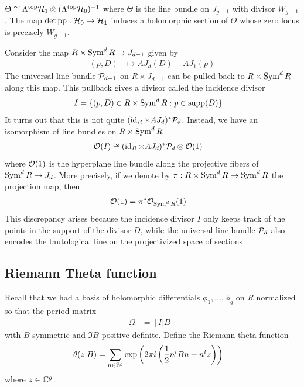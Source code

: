 \documentclass[12pt]{article}
\begin{document}
\begin{theorem}
    $\Theta \cong \Lambda^{\mathrm{top}} {\mathcal{H}}_1 \otimes (\Lambda^{\mathrm{top}} {\mathcal{H}}_0)^{-1}$ where $\Theta$ is the line bundle on $J_{g-1}$ with divisor $W_{g-1}$. The map $\det \mathrm{pp}:{\mathcal{H}}_0 \to {\mathcal{H}}_1$ induces a holomorphic section of $\Theta$ whose zero locus is precisely $W_{g-1}$.
\end{theorem}

\begin{remark}
      Consider the map $R \times \operatorname{Sym}^d R \to J_{d-1}$ given by \begin{align*}
        (p, D) & \mapsto AJ_d(D) - AJ_1(p)
    \end{align*}  The universal line bundle ${\mathcal{P}}_{d-1}$ on $R \times J_{d-1}$ can be pulled back to $R \times \operatorname{Sym}^d R$ along this map. This pullback gives a divisor called the incidence divisor \begin{align*}
        I & = \{(p, D) \in R \times \operatorname{Sym}^d R : p \in \operatorname{supp}(D) \}
    \end{align*} It turns out that this is not quite $(\operatorname{id}_R \times AJ_d)^* {\mathcal{P}}_d$. Instead, we have an isomorphism of line bundles on $R \times \operatorname{Sym}^d R$ \begin{align*}
        {\mathcal{O}}(I) & \cong (\operatorname{id}_R \times AJ_d)^* {\mathcal{P}}_d \otimes {\mathcal{O}}(1)
    \end{align*} where ${\mathcal{O}}(1)$ is the hyperplane line bundle along the projective fibers of $\operatorname{Sym}^d R \to J_d$. More precisely, if we denote by $\pi:R \times \operatorname{Sym}^d R \to \operatorname{Sym}^d R$ the projection map, then \begin{align*}
        {\mathcal{O}}(1) & = \pi^* \mathcal{O}_{\operatorname{Sym}^d R}(1)
    \end{align*} This discrepancy arises because the incidence divisor $I$ only keeps track of the points in the support of the divisor $D$, while the universal line bundle ${\mathcal{P}}_d$ also encodes the tautological line on the projectivized space of sections
\end{remark}
\subsection{Riemann Theta function}
Recall that we had a basis of holomorphic differentials $\phi_1, \ldots, \phi_g$ on $R$ normalized so that the period matrix \begin{align*}
    \Omega & = [I | B]
\end{align*} with $B$ symmetric and $\Im B$ positive definite. Define the Riemann theta function \begin{align*}
    \theta(z | B) & = \sum_{n \in \mathbb{Z}^g} \exp\left( 2\pi i \left( \frac{1}{2} n^t B n + n^t z \right) \right)
\end{align*} where $z \in \mathbb{C}^g$. 
\end{document}

